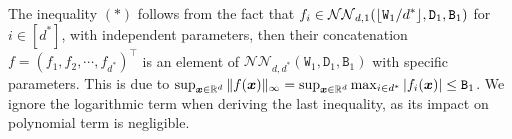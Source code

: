 The inequality $(*)$ follows from the fact that $f_i \in \mathcal{NN}_{d, 1}(\displaystyle\lfloor{\mathtt{W}_1/ d^*}\rfloor, \mathtt{D}_1, \mathtt{B}_1)$ for $i\in [d^*]$, with independent parameters, then their concatenation $f = (f_1, f_2, \cdots, f_{d^*})^\top$ is an element of $\mathcal{NN}_{d, d^*}(\mathtt{W}_1, \mathtt{D}_1, \mathtt{B}_1)$ with specific parameters. This is due to $\sup_{\bm{x} \in \mathbb{R}^{d}}\Vert{f(\bm{x})}\Vert_\infty = \sup_{\bm{x} \in \mathbb{R}^{d}}\max_{i \in d^*}\vert{f_i(\bm{x})}\vert \leq \mathtt{B}_1$. We ignore the logarithmic term when deriving the last inequality, as its impact on polynomial term is negligible.


